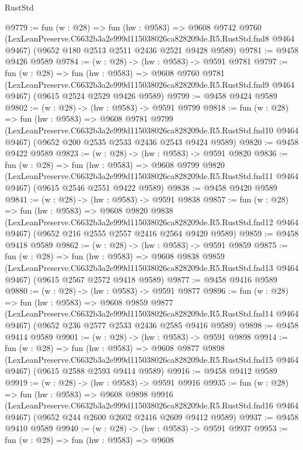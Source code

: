 \begin{lexlean}{RustStd}
\begin{coremodule}
@9779 := fun (w : @28) =>
  fun (hw : @9583) =>
  @9608
    @9742
    @9760
    (LexLeanPreserve.C6632b3a2e999d115038026ca828209de.R5.RustStd.fnd8 @9464 @9467)
    (@9652 @180 @2513 @2511 @2436 @2521 @9428 @9589)
@9781 := @9458 @9426 @9589
@9784 := (w : @28) -> (hw : @9583) -> @9591 @9781
@9797 := fun (w : @28) =>
  fun (hw : @9583) =>
  @9608
    @9760
    @9781
    (LexLeanPreserve.C6632b3a2e999d115038026ca828209de.R5.RustStd.fnd9 @9464 @9467)
    (@9615 @2524 @2529 @9426 @9589)
@9799 := @9458 @9424 @9589
@9802 := (w : @28) -> (hw : @9583) -> @9591 @9799
@9818 := fun (w : @28) =>
  fun (hw : @9583) =>
  @9608
    @9781
    @9799
    (LexLeanPreserve.C6632b3a2e999d115038026ca828209de.R5.RustStd.fnd10 @9464 @9467)
    (@9652 @200 @2535 @2533 @2436 @2543 @9424 @9589)
@9820 := @9458 @9422 @9589
@9823 := (w : @28) -> (hw : @9583) -> @9591 @9820
@9836 := fun (w : @28) =>
  fun (hw : @9583) =>
  @9608
    @9799
    @9820
    (LexLeanPreserve.C6632b3a2e999d115038026ca828209de.R5.RustStd.fnd11 @9464 @9467)
    (@9615 @2546 @2551 @9422 @9589)
@9838 := @9458 @9420 @9589
@9841 := (w : @28) -> (hw : @9583) -> @9591 @9838
@9857 := fun (w : @28) =>
  fun (hw : @9583) =>
  @9608
    @9820
    @9838
    (LexLeanPreserve.C6632b3a2e999d115038026ca828209de.R5.RustStd.fnd12 @9464 @9467)
    (@9652 @216 @2555 @2557 @2416 @2564 @9420 @9589)
@9859 := @9458 @9418 @9589
@9862 := (w : @28) -> (hw : @9583) -> @9591 @9859
@9875 := fun (w : @28) =>
  fun (hw : @9583) =>
  @9608
    @9838
    @9859
    (LexLeanPreserve.C6632b3a2e999d115038026ca828209de.R5.RustStd.fnd13 @9464 @9467)
    (@9615 @2567 @2572 @9418 @9589)
@9877 := @9458 @9416 @9589
@9880 := (w : @28) -> (hw : @9583) -> @9591 @9877
@9896 := fun (w : @28) =>
  fun (hw : @9583) =>
  @9608
    @9859
    @9877
    (LexLeanPreserve.C6632b3a2e999d115038026ca828209de.R5.RustStd.fnd14 @9464 @9467)
    (@9652 @236 @2577 @2533 @2436 @2585 @9416 @9589)
@9898 := @9458 @9414 @9589
@9901 := (w : @28) -> (hw : @9583) -> @9591 @9898
@9914 := fun (w : @28) =>
  fun (hw : @9583) =>
  @9608
    @9877
    @9898
    (LexLeanPreserve.C6632b3a2e999d115038026ca828209de.R5.RustStd.fnd15 @9464 @9467)
    (@9615 @2588 @2593 @9414 @9589)
@9916 := @9458 @9412 @9589
@9919 := (w : @28) -> (hw : @9583) -> @9591 @9916
@9935 := fun (w : @28) =>
  fun (hw : @9583) =>
  @9608
    @9898
    @9916
    (LexLeanPreserve.C6632b3a2e999d115038026ca828209de.R5.RustStd.fnd16 @9464 @9467)
    (@9652 @244 @2600 @2602 @2416 @2609 @9412 @9589)
@9937 := @9458 @9410 @9589
@9940 := (w : @28) -> (hw : @9583) -> @9591 @9937
@9953 := fun (w : @28) =>
  fun (hw : @9583) =>
  @9608

\end{coremodule}
\end{lexlean}
